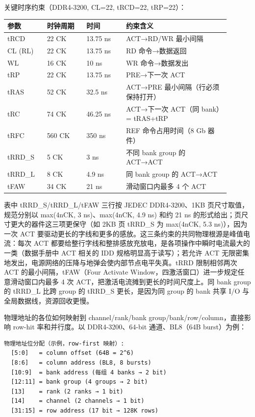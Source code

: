 关键时序约束（DDR4-3200, CL=22, tRCD=22, tRP=22）：

\begin{longtable}{L{0.16\linewidth}L{0.16\linewidth}L{0.16\linewidth}L{0.42\linewidth}}
\toprule
参数 & 时钟周期 & 时间 & 约束含义 \\
\midrule
tRCD & 22 CK & 13.75 ns & ACT→RD/WR 最小间隔 \\\tablerowrule
CL (RL) & 22 CK & 13.75 ns & RD 命令→数据返回 \\\tablerowrule
WL & 16 CK & 10 ns & WR 命令→数据发出 \\\tablerowrule
tRP & 22 CK & 13.75 ns & PRE→下一次 ACT \\\tablerowrule
tRAS & 52 CK & 32.5 ns & ACT→PRE 最小间隔（行必须保持打开） \\\tablerowrule
tRC & 74 CK & 46.25 ns & ACT→下一次 ACT（同 bank）= tRAS+tRP \\\tablerowrule
tRFC & 560 CK & 350 ns & REF 命令占用时间（8 Gb 器件） \\\tablerowrule
tRRD\_S & 5 CK & 3 ns & 不同 bank group 的 ACT→ACT \\\tablerowrule
tRRD\_L & 8 CK & 4.9 ns & 同 bank group 的 ACT→ACT \\\tablerowrule
tFAW & 34 CK & 21 ns & 滑动窗口内最多 4 个 ACT \\
\bottomrule
\end{longtable}

表中 tRRD\_S/tRRD\_L/tFAW 三行按 JEDEC DDR4-3200、1KB 页尺寸取值，规范分别以 max(4nCK, 3 ns)、max(4nCK, 4.9 ns) 和约 21 ns 的形式给出；页尺寸更大的器件这三项更保守（如 2KB 页 tRRD\_S 为 max(4nCK, 5.3 ns)），因为一次 ACT 要驱动更长的字线和更多的感放。这三条约束的共同物理根源是峰值电流：每次 ACT 都要给整行字线和整排感放充放电，是各项操作中瞬时电流最大的一类（数据手册中 ACT 相关的 IDD 规格明显高于读写）；若允许 ACT 无限密集地发出，电源网络的压降与地弹会使内部节点电平失真。tRRD 限制相邻两次 ACT 的最小间隔，tFAW（Four Activate Window，四激活窗口）进一步规定任意滑动窗口内最多 4 次 ACT，把激活电流摊到更长的时间尺度上。同 bank group 的 tRRD\_L 比跨 group 的 tRRD\_S 更长，是因为同 group 的 bank 共享 I/O 与全局数据线，资源回收更慢。


物理地址的各位如何映射到 channel/rank/bank group/bank/row/column，直接影响 row-hit 率和并行度。以 DDR4-3200、64-bit 通道、BL8（64B burst）为例：

\begin{lstlisting}
物理地址位分配（示例，row-first 映射）:
  [5:0]   = column offset (64B = 2^6)
  [8:6]   = column address (BL8, 8 bursts)
  [10:9]  = bank address (每组 4 banks → 2 bit)
  [12:11] = bank group (4 groups → 2 bit)
  [13]    = rank (2 ranks → 1 bit)
  [14]    = channel (2 channels → 1 bit)
  [31:15] = row address (17 bit → 128K rows)
\end{lstlisting}

